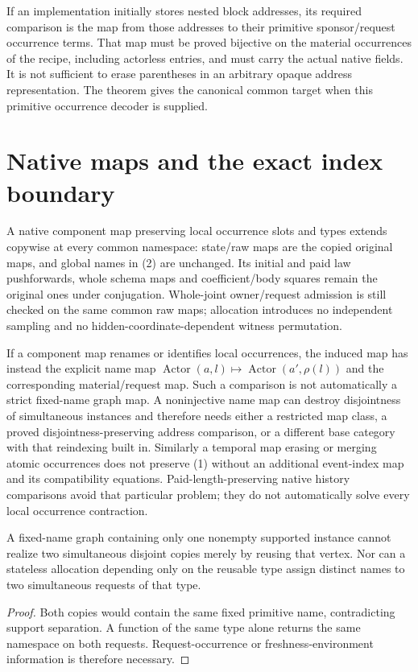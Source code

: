 \documentclass[11pt]{article}
\begin{document}
If an implementation initially stores nested block addresses, its required comparison is the map from those addresses to their primitive sponsor/request occurrence terms. That map must be proved bijective on the material occurrences of the recipe, including actorless entries, and must carry the actual native fields. It is not sufficient to erase parentheses in an arbitrary opaque address representation. The theorem gives the canonical common target when this primitive occurrence decoder is supplied.

\section{Native maps and the exact index boundary}
A native component map preserving local occurrence slots and types extends copywise at every common namespace: state/raw maps are the copied original maps, and global names in (2) are unchanged. Its initial and paid law pushforwards, whole schema maps and coefficient/body squares remain the original ones under conjugation. Whole-joint owner/request admission is still checked on the same common raw maps; allocation introduces no independent sampling and no hidden-coordinate-dependent witness permutation.

If a component map renames or identifies local occurrences, the induced map has instead the explicit name map
$\operatorname{Actor}(a,l)\mapsto\operatorname{Actor}(a',\rho(l))$ and the corresponding material/request map. Such a comparison is not automatically a strict fixed-name graph map. A noninjective name map can destroy disjointness of simultaneous instances and therefore needs either a restricted map class, a proved disjointness-preserving address comparison, or a different base category with that reindexing built in. Similarly a temporal map erasing or merging atomic occurrences does not preserve (1) without an additional event-index map and its compatibility equations. Paid-length-preserving native history comparisons avoid that particular problem; they do not automatically solve every local occurrence contraction.

\begin{proposition}
A fixed-name graph containing only one nonempty supported instance cannot realize two simultaneous disjoint copies merely by reusing that vertex. Nor can a stateless allocation depending only on the reusable type assign distinct names to two simultaneous requests of that type.
\end{proposition}
\begin{proof}
Both copies would contain the same fixed primitive name, contradicting support separation. A function of the same type alone returns the same namespace on both requests. Request-occurrence or freshness-environment information is therefore necessary.\end{proof}
\end{document}

